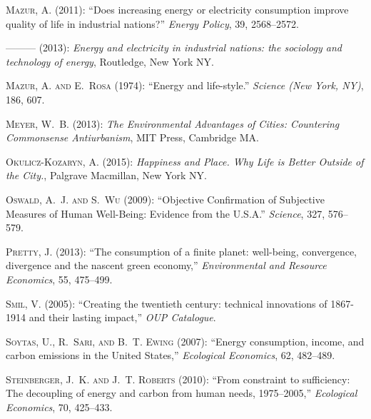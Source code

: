 \documentclass[10pt, letterpaper]{article}
\begin{document}
\begin{spacing}{1.0}
\begin{thebibliography}{49}
\textsc{Mazur, A.} (2011): \enquote{Does increasing energy or electricity
  consumption improve quality of life in industrial nations?} \emph{Energy
  Policy}, 39, 2568--2572.

---\hspace{-.1pt}---\hspace{-.1pt}--- (2013): \emph{Energy and electricity in
  industrial nations: the sociology and technology of energy}, Routledge, New
  York NY.

\textsc{Mazur, A. and E.~Rosa} (1974): \enquote{Energy and life-style.}
  \emph{Science (New York, NY)}, 186, 607.

\textsc{Meyer, W.~B.} (2013): \emph{The Environmental Advantages of Cities:
  Countering Commonsense Antiurbanism}, MIT Press, Cambridge MA.

\textsc{Okulicz-Kozaryn, A.} (2015): \emph{Happiness and Place. Why Life is
  Better Outside of the City.}, Palgrave Macmillan, New York NY.

\textsc{Oswald, A.~J. and S.~Wu} (2009): \enquote{{Objective Confirmation of
  Subjective Measures of Human Well-Being: Evidence from the U.S.A.}}
  \emph{Science}, 327, 576--579.

\textsc{Pretty, J.} (2013): \enquote{The consumption of a finite planet:
  well-being, convergence, divergence and the nascent green economy,}
  \emph{Environmental and Resource Economics}, 55, 475--499.

\textsc{Smil, V.} (2005): \enquote{Creating the twentieth century: technical
  innovations of 1867-1914 and their lasting impact,} \emph{OUP Catalogue}.

\textsc{Soytas, U., R.~Sari, and B.~T. Ewing} (2007): \enquote{Energy
  consumption, income, and carbon emissions in the United States,}
  \emph{Ecological Economics}, 62, 482--489.

\textsc{Steinberger, J.~K. and J.~T. Roberts} (2010): \enquote{From constraint
  to sufficiency: The decoupling of energy and carbon from human needs,
  1975--2005,} \emph{Ecological Economics}, 70, 425--433.


\end{thebibliography}
\end{spacing}
\end{document}
